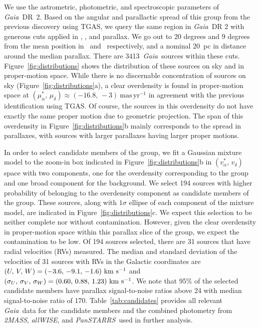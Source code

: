 \documentclass[modern,letterpaper]{aastex61}
\newcommand{\project}[1]{\textsl{#1}}
\newcommand{\acronym}[1]{{\small{#1}}}
\newcommand{\gaia}{\project{Gaia}}
\newcommand{\tmass}{\project{\acronym{2MASS}}}
\newcommand{\allwise}{\project{\acronym{allWISE}}}
\newcommand{\panstarrs}{\project{\acronym{PanSTARRS}}}
\newcommand{\figname}{Figure}
\newcommand{\tgas}{\acronym{TGAS}}
\newcommand{\kms}{\ensuremath{\rm km~s^{-1}}}
\newcommand{\ra}{\text{R.A.}}
\newcommand{\dec}{\text{Decl.}}
\newcommand{\pmra}{\ensuremath{\mu_\alpha^*}}
\newcommand{\pmdec}{\ensuremath{\mu_\delta}}
\newcommand{\masyr}{\ensuremath{\mathrm{mas}\,\mathrm{yr}^{-1}}}
\newcommand{\nstarsInRegion}{3413}
\begin{document}
We use the astrometric, photometric, and spectroscopic parameters of
\gaia\ DR~2.
Based on the angular and parallactic spread of this group from the previous
discovery using \tgas, we query the same region in \gaia\ DR 2 with generous
cuts applied in \ra, \dec, and parallax.
We go out to 20 degrees and 9 degrees from the mean position in \ra\ and \dec\
respectively, and a nominal 20~pc in distance around the median parallax.
There are \nstarsInRegion\ \gaia\ sources within these cuts.
Figure~\ref{fig:distributions} shows the distribution of these sources on sky
and in proper-motion space.
While there is no discernable concentration of sources on sky
(\figname~\ref{fig:distributions}a),
a clear overdensity is found in proper-motion space at
$(\pmra,\,\pmdec)\approx(-16.8,\,-3)~\masyr$ in agreement with the previous
identification using \tgas.
Of course, the sources in this overdensity do not have exactly the same proper
motion due to geometric projection.
The span of this overdensity in \figname~\ref{fig:distributions}b
mainly corresponds to the spread in parallaxes,
with sources with larger parallaxes having larger proper motions.

In order to select candidate members of the group,
we fit a Gaussian mixture model to the zoom-in box indicated in
\figname~\ref{fig:distributions}b in $(v_\alpha^*,\,v_\delta)$ space
with two components, one for the overdensity corresponding to the group and
one broad component for the background.
We select 194 sources with higher probability of belonging to the overdensity
component as candidate members of the group.
These sources, along with $1\sigma$ ellipse of each component of the mixture model,
are indicated in \figname~\ref{fig:distributions}c.
We expect this selection to be neither complete nor without contamination.
However, given the clear overdensity in proper-motion space within this parallax slice
of the group, we expect the contamination to be low.
Of 194 sources selected, there are 31 sources that have radial velocities (RVs)
measured.
The median and standard deviation of the velocities of 31 sources with RVs in
the Galactic coordinates are $(U,\,V,\,W) = (-3.6,\,-9.1,\,-1.6)~\kms$ and
$(\sigma_U,\,\sigma_V,\,\sigma_W) = (0.60,\,0.88,\,1.23)~\kms$.
We note that 95\% of the selected candidate members have parallax
signal-to-noise ratios above 24 with median signal-to-noise ratio of 170.
Table~\ref{tab:candidates} provides all relevant \gaia\ data for the candidate members
and the combined photometry from \tmass, \allwise, and \panstarrs\
used in further analysis.
\end{document}
